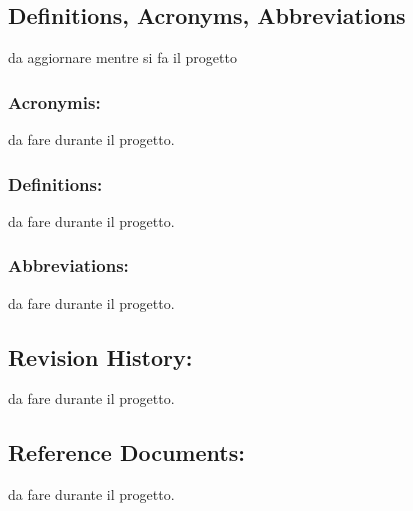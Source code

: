 \documentclass[titlepage]{article}
\begin{document}
\subsection{Deﬁnitions, Acronyms, Abbreviations}
da aggiornare mentre si fa il progetto
\subsubsection{Acronymis:}
da fare durante il progetto.
\subsubsection{Definitions:}
da fare durante il progetto.
\subsubsection{Abbreviations:}
da fare durante il progetto.
\subsection{Revision History: }
da fare durante il progetto.
\subsection{Reference Documents:}
da fare durante il progetto.
\end{document}
